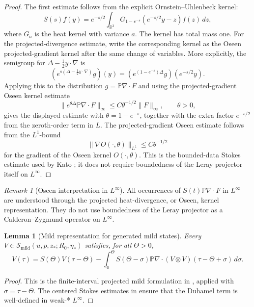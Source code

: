 \documentclass[11pt]{amsart}
\theoremstyle{plain}
\newtheorem{lemma}[lemma]{Lemma}
\theoremstyle{definition}
\theoremstyle{remark}
\newtheorem{remark}[remark]{Remark}
\numberwithin{equation}{section}
\newcommand{\R}{\mathbb R}
\newcommand{\calS}{\mathcal S}
\begin{document}
\begin{proof}
The first estimate follows from the explicit Ornstein--Uhlenbeck kernel:
\[
   S(s)f(y)=e^{-s/2}
   \int_{\R^3}G_{1-e^{-s}}(e^{-s/2}y-z)f(z)\,dz,
\]
where \(G_a\) is the heat kernel with variance \(a\).  The kernel has total
mass one.  For the projected-divergence estimate, write the corresponding
kernel as the Oseen projected-gradient kernel after the same change of
variables.  More explicitly, the semigroup for
\(\Delta-\frac12y\cdot\nabla\) is
\[
   (e^{s(\Delta-\frac12y\cdot\nabla)}g)(y)
   =
   (e^{(1-e^{-s})\Delta}g)(e^{-s/2}y).
\]
Applying this to the distribution \(g=\mathbb P\nabla\cdot F\) and using the
projected-gradient Oseen kernel estimate
\[
   \|e^{\theta\Delta}\mathbb P\nabla\cdot F\|_\infty
   \le C\theta^{-1/2}\|F\|_\infty,\qquad \theta>0,
\]
gives the displayed estimate with \(\theta=1-e^{-s}\), together with the
extra factor \(e^{-s/2}\) from the zeroth-order term in \(L\).  The
projected-gradient Oseen estimate follows from the \(L^1\)-bound
\[
   \|\nabla O(\cdot,\theta)\|_{L^1}\le C\theta^{-1/2}
\]
for the gradient of the Oseen kernel \(O(\cdot,\theta)\).  This is the
bounded-data Stokes estimate used by Kato \cite{Kato1984}; it does not require
boundedness of the Leray projector itself on \(L^\infty\).
\end{proof}

\begin{remark}[Oseen interpretation in \(L^\infty\)]
\label{p1:rem:oseen-Linfty}
All occurrences of \(S(t)\mathbb P\nabla\cdot F\) in \(L^\infty\) are
understood through the projected heat-divergence, or Oseen, kernel
representation.  They do not use boundedness of the Leray projector as a
Calderon--Zygmund operator on \(L^\infty\).
\end{remark}

\begin{lemma}[Mild representation for generated mild states]
\label{p1:lem:mild-representation}
Every \(V\in\calS_{\mathrm{mild}}(u,p,z_*;R_0,\eta_*)\) satisfies, for all
\(\Theta>0\),
\[
   V(\tau)
   =
   S(\Theta)V(\tau-\Theta)
   -
   \int_0^\Theta
   S(\Theta-\sigma)\mathbb P\nabla\cdot
   (V\otimes V)(\tau-\Theta+\sigma)\,d\sigma .
\]
\end{lemma}

\begin{proof}
This is the finite-interval projected mild formulation in
, applied with \(\sigma=\tau-\Theta\).  The centered
Stokes estimates in  ensure that the
Duhamel term is well-defined in weak-* \(L^\infty\).
\end{proof}
\end{document}
